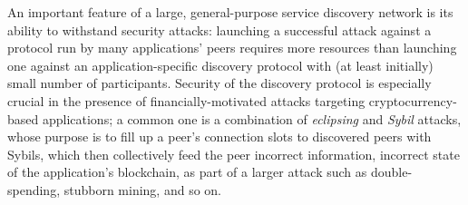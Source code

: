 
An important feature of a large, general-purpose service discovery network is its ability to withstand security attacks: launching a successful attack against a protocol run by many applications' peers requires more resources than launching one against an application-specific discovery protocol with (at least initially) small number of participants. Security of the discovery protocol is especially crucial in the presence of financially-motivated attacks targeting cryptocurrency-based applications; a common one is a combination of \textit{eclipsing} and \textit{Sybil} attacks, whose purpose is to fill up a peer's connection slots to discovered peers with Sybils, which then collectively feed the peer incorrect information, \eg incorrect state of the application's blockchain, as part of a larger attack such as double-spending, stubborn mining, and so on. 



